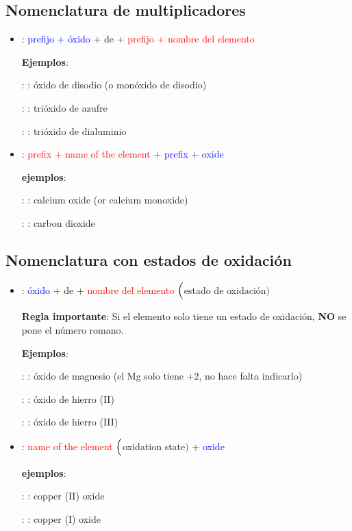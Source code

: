 \subsection{Nomenclatura de multiplicadores}

\begin{itemize}
    \item \noindent{}: \textcolor{blue}{prefijo + óxido} + de + \textcolor{red}{prefijo + nombre del elemento}

    \textbf{Ejemplos}:

    : : óxido de disodio (o monóxido de disodio)

    : : trióxido de azufre

    : : trióxido de dialuminio


    \item \noindent{}: \textcolor{red}{prefix + name of the element} + \textcolor{blue}{prefix + oxide}

    \textbf{ejemplos}:

    : : calcium oxide (or calcium monoxide)

    : : carbon dioxide
\end{itemize}

\subsection{Nomenclatura con estados de oxidación}

\begin{itemize}
    \item \noindent{}: \textcolor{blue}{óxido} + de + \textcolor{red}{nombre del elemento} $\Bigl($\textcolor{green!50!black}{estado de oxidación}$\Bigr)$

    \textbf{Regla importante}: Si el elemento solo tiene un estado de oxidación, \textbf{NO} se pone el número romano.

    \textbf{Ejemplos}:

    : : óxido de magnesio (el Mg solo tiene +2, no hace falta indicarlo)

    : : óxido de hierro (II)

    : : óxido de hierro (III)


    \item \noindent{}: \textcolor{red}{name of the element} $\Bigl($\textcolor{green!50!black}{oxidation state}$\Bigr)$ + \textcolor{blue}{oxide}

    \textbf{ejemplos}:

    : : copper (II) oxide

    : : copper (I) oxide
\end{itemize}

